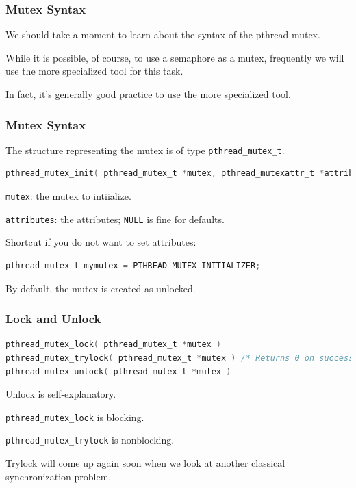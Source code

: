 \begin{frame}
	\frametitle{Mutex Syntax}

	We should take a moment to learn about the syntax of the pthread mutex.

	While it is possible, of course, to use a semaphore as a mutex, frequently we will use the more specialized tool for this task.

	In fact, it's generally good practice to use the more specialized tool.

\end{frame}

\begin{frame}[fragile]
	\frametitle{Mutex Syntax}

	The structure representing the mutex is of type \texttt{pthread\_mutex\_t}.

	\begin{lstlisting}[language=C]
pthread_mutex_init( pthread_mutex_t *mutex, pthread_mutexattr_t *attributes )
\end{lstlisting}

	\texttt{mutex}: the mutex to intiialize.

	\texttt{attributes}: the attributes; \texttt{NULL} is fine for defaults.

	Shortcut if you do not want to set attributes:

	\begin{lstlisting}[language=C]
pthread_mutex_t mymutex = PTHREAD_MUTEX_INITIALIZER;
\end{lstlisting}

	By default, the mutex is created as unlocked.

\end{frame}

\begin{frame}[fragile]
	\frametitle{Lock and Unlock}

	\begin{lstlisting}[language=C]
pthread_mutex_lock( pthread_mutex_t *mutex )
pthread_mutex_trylock( pthread_mutex_t *mutex ) /* Returns 0 on success */
pthread_mutex_unlock( pthread_mutex_t *mutex )
\end{lstlisting}

	Unlock is self-explanatory.

	\texttt{pthread\_mutex\_lock} is blocking.

	\texttt{pthread\_mutex\_trylock} is nonblocking.

	Trylock will come up again soon when we look at another classical synchronization problem.

\end{frame}

